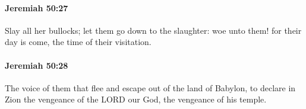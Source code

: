 		\paragraph{Jeremiah 50:27} %
			\label{JEREMIAH-50-27}

			Slay all her bullocks; let them go down to the slaughter: woe unto them! for their day is come, the time of their visitation.


		\paragraph{Jeremiah 50:28} %
			\label{JEREMIAH-50-28}

			The voice of them that flee and escape out of the land of Babylon, to declare in Zion the vengeance of the LORD our God, the vengeance of his temple.


